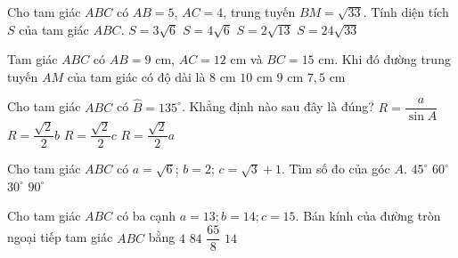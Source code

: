 \begin{ex}
	Cho tam giác $ABC$ có $AB=5$, $AC=4$, trung tuyến $BM=\sqrt{33}$. Tính diện tích $S$ của tam giác $ABC$.
	\choice
	{$S=3\sqrt{6}$}
	{\True $S=4\sqrt{6}$}
	{$S=2\sqrt{13}$}
	{$S=24\sqrt{33}$}
\end{ex}
\begin{ex}
	Tam giác $ABC$ có $AB=9$ cm, $AC=12$ cm và $BC=15$ cm. Khi đó đường trung tuyến $AM$ của tam giác có độ dài là
	\choice
	{$8$ cm}
	{$10$ cm}
	{$9$ cm}
	{\True $7{,}5$ cm}
\end{ex}
\begin{ex}
	Cho tam giác $ABC$ có $\widehat{B}=135^\circ$. Khẳng định nào sau đây là đúng?
	\choice
	{$R=\dfrac{a}{\sin A}$}
	{\True $R=\dfrac{\sqrt{2}}{2}b$}
	{$R=\dfrac{\sqrt{2}}{2}c$}
	{$R=\dfrac{\sqrt{2}}{2}a$}
\end{ex}
\begin{ex}
	Cho tam giác $ABC$ có $a=\sqrt{6}$; $b=2$; $c=\sqrt{3}+1$. Tìm số đo của góc $A$.
	\choice
	{$45^{\circ}$}
	{\True $60^{\circ}$}
	{$30^{\circ}$}
	{$90^{\circ}$}
\end{ex}
\begin{ex}
	Cho tam giác $ABC$ có ba cạnh $a=13;b=14;c=15$. Bán kính của đường tròn ngoại tiếp tam giác $ABC$ bằng
	\choice
	{$4$}
	{$84$}
	{\True $\dfrac{65}{8}$}
	{$14$}
\end{ex}

